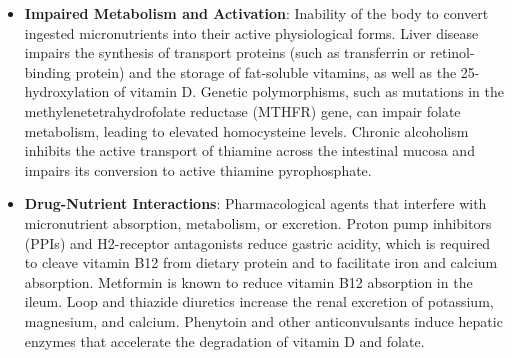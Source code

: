 \begin{itemize}
\item \textbf{Impaired Metabolism and Activation}: Inability of the body to convert ingested micronutrients into their active physiological forms. Liver disease impairs the synthesis of transport proteins (such as transferrin or retinol-binding protein) and the storage of fat-soluble vitamins, as well as the 25-hydroxylation of vitamin D. Genetic polymorphisms, such as mutations in the methylenetetrahydrofolate reductase (MTHFR) gene, can impair folate metabolism, leading to elevated homocysteine levels. Chronic alcoholism inhibits the active transport of thiamine across the intestinal mucosa and impairs its conversion to active thiamine pyrophosphate.
\item \textbf{Drug-Nutrient Interactions}: Pharmacological agents that interfere with micronutrient absorption, metabolism, or excretion. Proton pump inhibitors (PPIs) and H2-receptor antagonists reduce gastric acidity, which is required to cleave vitamin B12 from dietary protein and to facilitate iron and calcium absorption. Metformin is known to reduce vitamin B12 absorption in the ileum. Loop and thiazide diuretics increase the renal excretion of potassium, magnesium, and calcium. Phenytoin and other anticonvulsants induce hepatic enzymes that accelerate the degradation of vitamin D and folate.
\end{itemize}

